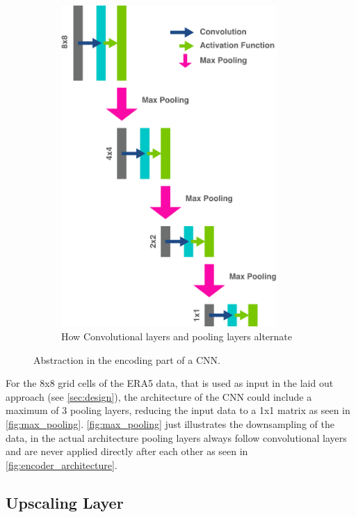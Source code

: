 \begin{figure}
\begin{subfigure}{0.25\textwidth}
        \includegraphics[width=0.9\textwidth]{resources/images/encoder_architecture.png}
        \caption{How Convolutional layers and pooling layers alternate}
        \label{fig:encoder_architecture}
    \end{subfigure}
    \caption{Abstraction in the encoding part of a CNN.}
\end{figure}


For the 8x8 grid cells of the ERA5 data, that is used as input in the laid out approach (see \autoref{sec:design}), the architecture of the CNN could include a maximum of 3 pooling layers, reducing the input data to a 1x1 matrix as seen in \autoref{fig:max_pooling}. \autoref{fig:max_pooling} just illustrates the downsampling of the data, in the actual architecture pooling layers always follow convolutional layers and are never applied directly after each other as seen in \autoref{fig:encoder_architecture}. 


\subsection*{Upscaling Layer}

